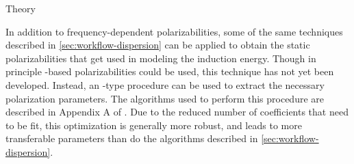 \begin{paragraph}{Theory}

In addition to frequency-dependent polarizabilities, some of the same techniques
described in \cref{sec:workflow-dispersion} can be applied to obtain the
static polarizabilities that get used in modeling the
\sapt induction energy. Though in principle \isa-based polarizabilities could be
used, this technique has not yet been developed. Instead, an \idma-type
procedure can be used to extract the necessary polarization parameters. The
algorithms used to perform this procedure are described in Appendix A of
. Due to the reduced number of coefficients that need to
be fit, this optimization is generally more robust, and leads to more
transferable parameters than do the algorithms described in
\cref{sec:workflow-dispersion}.

\end{paragraph}
